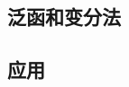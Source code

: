 \subsection{泛函和变分法}
\label{subsec:functional}

\subsection{应用}
\label{subsec:functional_applications}